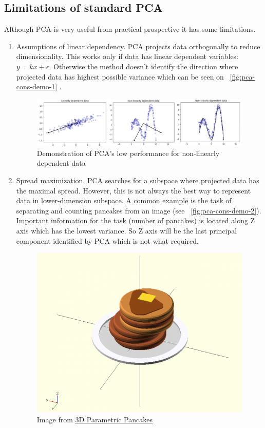 \subsection{Limitations of standard PCA}
Although PCA is very useful from practical prospective it has some limitations.
\begin{enumerate}
	\item Assumptions of linear dependency.
	PCA projects data orthogonally to reduce dimensionality. This works only if data has linear dependent variables:  $y = k x + \epsilon$. Otherwise the method doesn't identify the direction where  projected data has highest possible variance which can be seen on   ~\autoref{fig:pca-cons-demo-1} . 
	
	\begin{figure}[h]
		\centering
		\includegraphics[scale=0.5]{img/pca-linear-separation-demo.png}
		\caption{\label{fig:pca-cons-demo-1}Demonstration of PCA's low performance for non-linearly dependent data}
	\end{figure}
	
	\item Spread maximization. 
	PCA searches for a subspace where projected data has the maximal spread. However, this is not always the best way to represent data in lower-dimension subspace. A common example is the task of separating and counting pancakes from an image (see ~\autoref{fig:pca-cons-demo-2}). Important information for the task (number of pancakes) is located along Z axis which has the lowest variance. So Z axis will be the last principal component identified by PCA which is not what required. 
	
	\begin{figure}
		\centering
		\includegraphics[width=.5\textwidth, scale=0.4]{img/pancakes.png}
		\caption{\label{fig:pca-cons-demo-2}Image from  \href{http://golancourses.net/2014/kevan/01/23/3d-parametric-pancakes/}{3D Parametric Pancakes}
		}
	\end{figure}
	

\end{enumerate}
